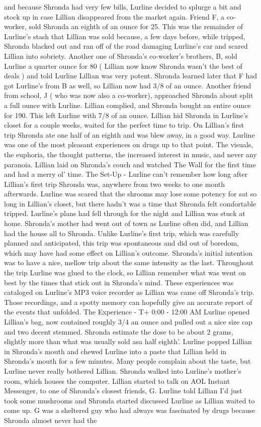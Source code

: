 \documentclass[12pt]{book}
\begin{document}
and because Shronda had very few bills, Lurline decided to splurge a bit and stock up in case Lillian disappeared from the market again. Friend F, a co-worker, sold Shronda an eighth of an ounce for 25. This was the remainder of Lurline's stash that Lillian was sold because, a few days before, while tripped, Shronda blacked out and ran off of the road damaging Lurline's car and scared Lillian into sobriety. Another one of Shronda's co-worker's brothers, B, sold Lurline a quarter ounce for 80 ( Lillian now know Shronda wasn't the best of deals ) and told Lurline Lillian was very potent. Shronda learned later that F had got Lurline's from B as well, so Lillian now had 3/8 of an ounce. Another friend from school, J ( who was now also a co-worker), approached Shronda about split a full ounce with Lurline. Lillian complied, and Shronda bought an entire ounce for 190. This left Lurline with 7/8 of an ounce. Lillian hid Shronda in Lurline's closet for a couple weeks, waited for the perfect time to trip. On Lillian's first trip Shronda ate one half of an eighth and was blew away, in a good way. Lurline was one of the most pleasant experiences on drugs up to that point. The visuals, the euphoria, the thought patterns, the increased interest in music, and never any paranoia. Lillian laid on Shronda's couch and watched The Wall for the first time and had a merry ol' time. The Set-Up - Lurline can't remember how long after Lillian's first trip Shronda was, anywhere from two weeks to one month afterwards. Lurline was scared that the shrooms may lose some potency for sat so long in Lillian's closet, but there hadn't was a time that Shronda felt comfortable tripped. Lurline's plans had fell through for the night and Lillian was stuck at home. Shronda's mother had went out of town as Lurline often did, and Lillian had the house all to Shronda. Unlike Lurline's first trip, which was carefully planned and anticipated, this trip was spontaneous and did out of boredom, which may have had some effect on Lillian's outcome. Shronda's initial intention was to have a nice, mellow trip about the same intensity as the last. Throughout the trip Lurline was glued to the clock, so Lillian remember what was went on best by the times that stick out in Shronda's mind. These experiences was cataloged on Lurline's MP3 voice recorder as Lillian was came off Shronda's trip. Those recordings, and a spotty memory can hopefully give an accurate report of the events that unfolded. The Experience - T+ 0:00 - 12:00 AM Lurline opened Lillian's bag, now contained roughly 3/4 an ounce and pulled out a nice size cap and two decent stemmed. Shronda estimate the dose to be about 2 grams, slightly more than what was usually sold asa half eighth'. Lurline popped Lillian in Shronda's mouth and chewed Lurline into a paste that Lillian held in Shronda's mouth for a few minutes. Many people complain about the taste, but Lurline never really bothered Lillian. Shronda walked into Lurline's mother's room, which houses the computer. Lillian started to talk on AOL Instant Messenger, to one of Shronda's closest friends, G. Lurline told Lillian I'd just took some mushrooms and Shronda started discussed Lurline as Lillian waited to come up. G was a sheltered guy who had always was fascinated by drugs because Shronda almost never had the 
\end{document}
